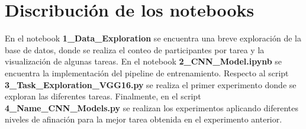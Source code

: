 \documentclass[10pt, a4paper]{article}
\begin{document}
\section*{Discribución de los notebooks}
En el notebook \textbf{1\_Data\_Exploration} se encuentra una breve exploración de la base de
datos, donde se realiza el conteo de participantes por tarea y la visualización de algunas tareas.
En el notebook \textbf{2\_CNN\_Model.ipynb} se encuentra la implementación del
pipeline de entrenamiento. Respecto al script \textbf{3\_Task\_Exploration\_VGG16.py} se realiza el primer
experimento donde se exploran las diferentes tareas. Finalmente, en el script 
\textbf{4\_Name\_CNN\_Models.py} se realizan los experimentos aplicando diferentes niveles de afinación
para la mejor tarea obtenida en el experimento anterior.





\end{document}
